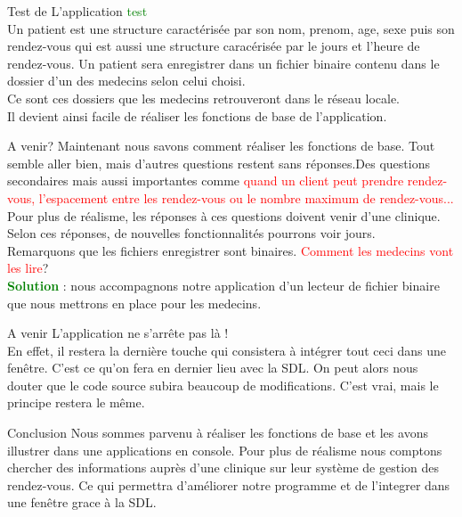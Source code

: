 \documentclass{beamer}
\begin{document}
\begin{frame}[t]{Test de L'application}
\textcolor{green}{test}\pause \\Un patient est une structure caractérisée par son nom, prenom, age, sexe puis son rendez-vous qui est aussi une structure caracérisée par le jours et l'heure de rendez-vous. Un patient sera enregistrer dans un fichier binaire contenu dans le dossier d'un des medecins selon celui choisi.\\Ce sont ces dossiers que les medecins retrouveront dans le réseau locale.\\Il devient ainsi facile de réaliser les fonctions de base de l'application. 
\end{frame}
\begin{frame}[t]{A venir?}
Maintenant nous savons comment réaliser les fonctions de base. Tout semble aller bien, mais d'autres questions restent sans réponses.\pause  Des questions secondaires mais aussi importantes comme \textcolor{red}{quand un client peut prendre rendez-vous, l'espacement entre les rendez-vous ou le nombre maximum de rendez-vous...}\pause \\Pour plus de réalisme, les réponses à ces questions doivent venir d'une clinique. Selon ces réponses, de nouvelles fonctionnalités pourrons voir jours.\pause \\Remarquons que les fichiers enregistrer sont binaires. \textcolor{red}{Comment les medecins vont les lire}? \pause \\ \textcolor{green}{\textbf{Solution}} : nous accompagnons notre application d'un lecteur de fichier binaire que nous mettrons en place pour les medecins.
\end{frame}

\begin{frame}{A venir}
L'application ne s'arrête pas là ! \\En effet, il restera la dernière touche qui consistera à intégrer tout ceci dans une fenêtre. C'est ce qu'on fera en dernier lieu avec la SDL. On peut alors nous douter que le code source subira beaucoup de modifications. C'est vrai, mais le principe restera le même.  
\end{frame}

\begin{frame}{Conclusion}
Nous sommes parvenu à réaliser les fonctions de base et les avons illustrer dans une applications en console. Pour plus de réalisme nous comptons chercher des informations auprès d'une clinique sur leur système de gestion des rendez-vous. Ce qui permettra d'améliorer notre programme et de l'integrer dans une fenêtre grace à la SDL.  \\
\end{frame}
\end{document}
